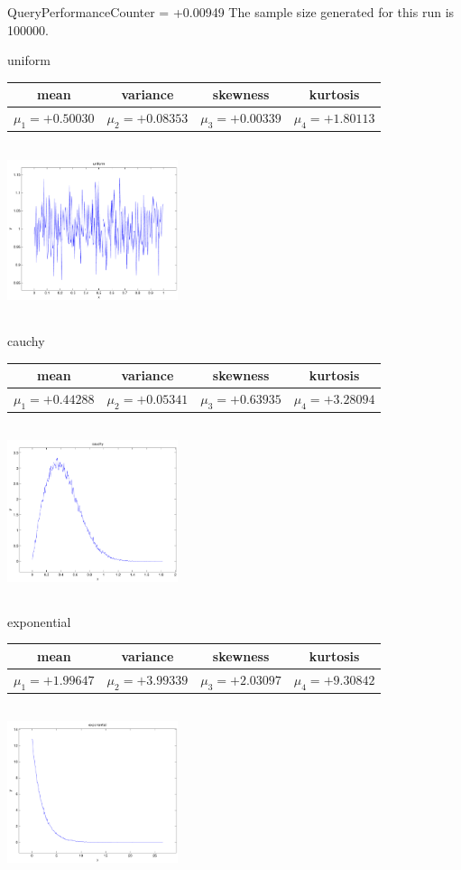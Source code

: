 \documentclass[9pt]{article}
\theoremstyle{plain}
\theoremstyle{definition}
\theoremstyle{remark}
\numberwithin{equation}{section}
\begin{document}
QueryPerformanceCounter  =  +0.00949
The sample size generated for this run is 100000.

\newpage
uniform \begin{tabular}{|c|c|c|c|}  mean & variance & skewness & kurtosis \\  \hline
$\mu_1 = +0.50030$ & $\mu_2 = +0.08353$ & $\mu_3 = +0.00339$ & $\mu_4 =+1.80113$ \\
\end{tabular}

\includegraphics[width=5cm,height=5cm]{uniform.pdf}

cauchy \begin{tabular}{|c|c|c|c|}  mean & variance & skewness & kurtosis \\  \hline
$\mu_1 = +0.44288$ & $\mu_2 = +0.05341$ & $\mu_3 = +0.63935$ & $\mu_4 =+3.28094$ \\
\end{tabular}

\includegraphics[width=5cm,height=5cm]{cauchy.pdf}

exponential \begin{tabular}{|c|c|c|c|}  mean & variance & skewness & kurtosis \\  \hline
$\mu_1 = +1.99647$ & $\mu_2 = +3.99339$ & $\mu_3 = +2.03097$ & $\mu_4 =+9.30842$ \\
\end{tabular}

\includegraphics[width=5cm,height=5cm]{exponential.pdf}
\end{document}

